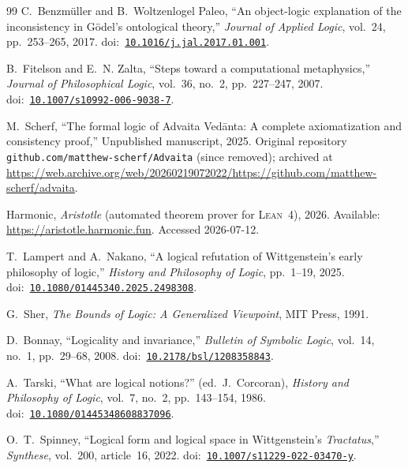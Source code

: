 \documentclass[10pt, letterpaper]{article}
\theoremstyle{definition}
\theoremstyle{remark}
\newcommand{\Lean}{\textsc{Lean}}
\begin{document}
\begin{thebibliography}{99}
C.~Benzm\"uller and B.~Woltzenlogel Paleo,
``An object-logic explanation of the inconsistency in G\"odel's
ontological theory,''
\emph{Journal of Applied Logic}, vol.~24, pp.~253--265, 2017.
\newline doi:~\href{https://doi.org/10.1016/j.jal.2017.01.001}{\texttt{10.1016/j.jal.2017.01.001}}.

B.~Fitelson and E.~N. Zalta,
``Steps toward a computational metaphysics,''
\emph{Journal of Philosophical Logic}, vol.~36, no.~2,
pp.~227--247, 2007.
\newline doi:~\href{https://doi.org/10.1007/s10992-006-9038-7}{\texttt{10.1007/s10992-006-9038-7}}.

M.~Scherf,
``The formal logic of Advaita Ved\=anta: A complete
axiomatization and consistency proof,''
Unpublished manuscript, 2025.
Original repository \texttt{github.com/matthew-scherf/Advaita}
(since removed); archived at
\url{https://web.archive.org/web/20260219072022/https://github.com/matthew-scherf/advaita}.

Harmonic,
\emph{Aristotle} (automated theorem prover for \Lean~4), 2026.
Available: \url{https://aristotle.harmonic.fun}.
Accessed 2026-07-12.

T.~Lampert and A.~Nakano,
``A logical refutation of Wittgenstein's early philosophy of
logic,''
\emph{History and Philosophy of Logic}, pp.~1--19, 2025.
\newline doi:~\href{https://doi.org/10.1080/01445340.2025.2498308}{\texttt{10.1080/01445340.2025.2498308}}.

G.~Sher,
\emph{The Bounds of Logic: A Generalized Viewpoint},
MIT Press, 1991.

D.~Bonnay,
``Logicality and invariance,''
\emph{Bulletin of Symbolic Logic}, vol.~14, no.~1, pp.~29--68,
2008.
\newline doi:~\href{https://doi.org/10.2178/bsl/1208358843}{\texttt{10.2178/bsl/1208358843}}.

A.~Tarski,
``What are logical notions?''
(ed.\ J.~Corcoran),
\emph{History and Philosophy of Logic}, vol.~7, no.~2,
pp.~143--154, 1986.
\newline doi:~\href{https://doi.org/10.1080/01445348608837096}{\texttt{10.1080/01445348608837096}}.

O.~T.~Spinney,
``Logical form and logical space in Wittgenstein's
\emph{Tractatus},''
\emph{Synthese}, vol.~200, article~16, 2022.
\newline doi:~\href{https://doi.org/10.1007/s11229-022-03470-y}{\texttt{10.1007/s11229-022-03470-y}}.


\end{thebibliography}
\end{document}
